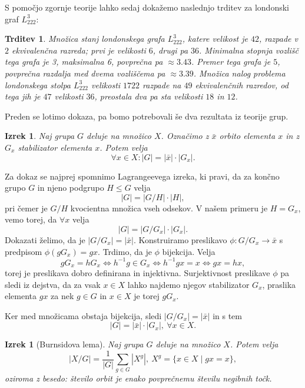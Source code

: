 \documentclass[12pt,a4paper]{amsart}
\theoremstyle{definition} %
\theoremstyle{plain} %
\newtheorem{izrek}[definicija]{Izrek}
\newtheorem{trditev}[definicija]{Trditev}
\begin{document}
S pomočjo zgornje teorije lahko sedaj dokažemo naslednjo trditev za londonski graf $L_{222}^3$:

\begin{trditev}
    \label{trd:simetrije-L222na3}
    Množica stanj londonskega grafa $L_{222}^3$, katere velikost je $42$, razpade v $2$ ekvivalenčna razreda; prvi je velikosti $6$, drugi pa $36$. Minimalna stopnja vozlišč tega grafa je 3, maksimalna 6, povprečna pa $\approx 3.43$. Premer tega grafa je $5$, povprečna razdalja med dvema vozliščema pa $\approx 3.39$. 
    Množica nalog problema londonskega stolpa $L_{222}^3$ velikosti $1722$ razpade na $49$ ekvivalenčnih razredov, od tega jih je $47$ velikosti $36$, preostala dva pa sta velikosti $18$ in $12$.
\end{trditev}

Preden se lotimo dokaza, pa bomo potrebovali še dva rezultata iz teorije grup. 

\begin{izrek}
    Naj grupa $G$ deluje na množico $X$. Označimo z $\bar{x}$ orbito elementa $x$ in z $G_x$ stabilizator elementa $x$. Potem velja
    \begin{equation}
        \forall x \in X: |G| = |\bar{x}| \cdot |G_x| .
        \label{eq:orb-stab}
    \end{equation}
\end{izrek}

\proof
    Za dokaz se najprej spomnimo Lagrangeevega izreka, ki pravi, da za končno grupo $G$ in njeno podgrupo $H \leq G$ velja
    \[ |G| = |G/H| \cdot |H|, \]
    pri čemer je $G/H$ kvocientna množica vseh odsekov.
    V našem primeru je $H = G_x$, vemo torej, da $\forall x$ velja
    \[ |G| = |G/G_x| \cdot |G_x|. \]
    Dokazati želimo, da je $|G/G_x| = |\bar{x}|.$ Konstruiramo preslikavo $\phi \colon G/G_x \rightarrow \bar{x}$ s predpisom $\phi(gG_x) = gx$. Trdimo, da je $\phi$ bijekcija. Velja
    \[ gG_x=hG_x \iff h^{-1}g \in G_x \iff h^{-1}gx=x \iff gx=hx, \]
    torej je preslikava dobro definirana in injektivna. Surjektivnost preslikave $\phi$ pa sledi iz dejstva, da za vsak $x \in X$ lahko najdemo njegov stabilizator $G_x$, praslika elementa $gx$ za nek $g \in G$ in $x \in X$ je torej $gG_x$. 
    
    Ker med množicama obstaja bijekcija, sledi $|G/G_x| = |\bar{x}|$ in s tem
    \[ |G| = |\bar{x}| \cdot |G_x|,\ \forall x \in X. \]
\endproof

\begin{izrek}[Burnsidova lema]
    Naj grupa $G$ deluje na množico $X$. Potem velja
    \begin{equation}
        |X/G| = \frac{1}{|G|} \sum_{g \in G} |X^g|, \ X^g=\{ x \in X \mid gx = x \},
        \label{eq:Burnside-lema}
    \end{equation}
    oziroma z besedo: število orbit je enako povprečnemu številu negibnih točk.
\end{izrek}
\end{document}
